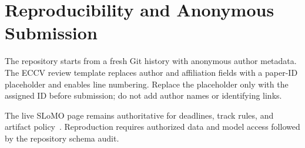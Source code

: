 \documentclass[runningheads]{llncs}
\begin{document}
\section{Reproducibility and Anonymous Submission}

The repository starts from a fresh Git history with anonymous author metadata.
The ECCV review template replaces author and affiliation fields with a paper-ID
placeholder and enables line numbering. Replace the placeholder only with the
assigned ID before submission; do not add author names or identifying links.

The live SLoMO page remains authoritative for deadlines, track rules, and
artifact policy~\cite{slomo2026}. Reproduction requires authorized data and
model access followed by the repository schema audit.

\clearpage



\end{document}
